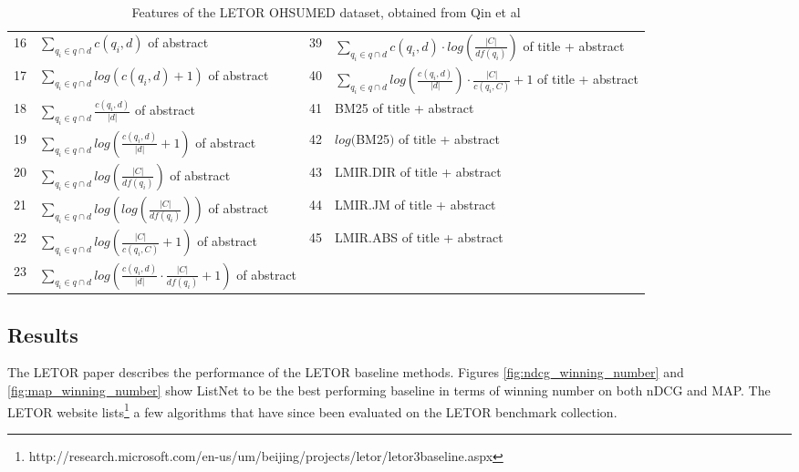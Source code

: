 \begin{table}[!h]
{\begin{tabular}{p{0.29cm}|p{6.88cm}||p{0.29cm}|p{6.90cm}}
16& $\sum\nolimits_{q_i \in q \cap d}c(q_i, d)$ of abstract		& 39& $\sum\nolimits_{q_i \in q \cap d}c(q_i,d)\cdot log(\frac{|C|}{df(q_i)})$ of title + abstract\\
17& $\sum\nolimits_{q_i \in q \cap d}log(c(q_i, d)+1)$ of abstract		& 40& $\sum\nolimits_{q_i \in q \cap d} log(\frac{c(q_i,d)}{|d|}) \cdot \frac{|C|}{c(q_i,C)}+1$ of title + abstract\\
18& $\sum\nolimits_{q_i \in q \cap d}\frac{c(q_i,d)}{|d|}$ of abstract		& 41& BM25 of title + abstract\\
19& $\sum\nolimits_{q_i \in q \cap d}log(\frac{c(q_i,d)}{|d|}+1)$ of abstract		& 42& $log($BM25$)$ of title + abstract\\
20& $\sum\nolimits_{q_i \in q \cap d}log(\frac{|C|}{df(q_i)})$ of abstract	& 43& LMIR.DIR of title + abstract\\

21& $\sum\nolimits_{q_i \in q \cap d}log(log(\frac{|C|}{df(q_i)}))$ of abstract					& 44& LMIR.JM of title + abstract\\
22&  $\sum\nolimits_{q_i \in q \cap d}log(\frac{|C|}{c(q_i,C)}+1)$ of abstract					& 45& LMIR.ABS of title + abstract\\
23& $\sum\nolimits_{q_i \in q \cap d}log(\frac{c(q_i,d)}{|d|} \cdot \frac{|C|}{df(q_i)}+1)$ of abstract					& & \\
\end{tabular}
}
\caption{Features of the LETOR OHSUMED dataset, obtained from Qin et al \cite{Qin2010}}
\label{tbl:features_ohsumed}
\end{table}
\subsection{Results}
The LETOR paper \cite{Qin2010} describes the performance of the LETOR baseline methods. Figures \ref{fig:ndcg_winning_number} and \ref{fig:map_winning_number} show ListNet to be the best performing baseline in terms of winning number on both \ac{nDCG} and \ac{MAP}. The LETOR website lists\footnote{http://research.microsoft.com/en-us/um/beijing/projects/letor/letor3baseline.aspx} a few algorithms that have since been evaluated on the LETOR benchmark collection.\\

